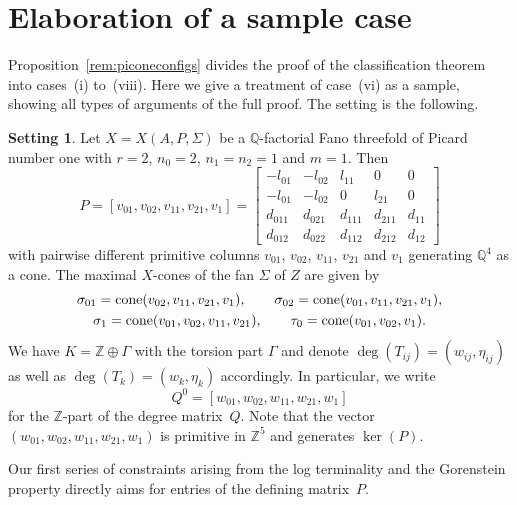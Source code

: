 \documentclass[10pt,a4paper]{amsart}
\theoremstyle{definition}
\newtheorem{setting}[thm]{Setting}
\def\ZZ{{\mathbb Z}}
\def\QQ{{\mathbb Q}}
\def\cone{{\rm cone}}
\numberwithin{equation}{section}
\begin{document}
\section{Elaboration of a sample case}
\label{sec:sample}

Proposition~\ref{rem:piconeconfigs} divides
the proof of the classification theorem
into cases~(i) to~(viii).
Here we give a treatment of case~(vi)
as a sample, showing all types of
arguments of the full proof.
The setting is the following.


\begin{setting}
\label{setting:r=2-n0=2-n1=1-n2=1-m=1}
Let $X = X(A,P,\Sigma)$ be a $\QQ$-factorial
Fano threefold of Picard number one with
$r=2$, $n_0=2$, $n_1=n_2=1$ and $m=1$.
Then
\begin{equation*}
P =[v_{01},v_{02},v_{11},v_{21},v_1] =
\begin{bmatrix}
-l_{01} & -l_{02} & l_{11} & 0 & 0
\\
-l_{01} & -l_{02} & 0 & l_{21} & 0
\\
d_{011} & d_{021} & d_{111} & d_{211} & d_{11}
\\
d_{012} & d_{022} & d_{112} & d_{212} & d_{12}
\end{bmatrix}
\end{equation*}
with pairwise different primitive columns
$v_{01}$, $v_{02}$, $v_{11}$, $v_{21}$ and $v_1$
generating $\QQ^4$ as a cone.
The maximal $X$-cones of the fan $\Sigma$ of $Z$ are given by
\begin{gather*}
\sigma_{01} = \cone(v_{02},v_{11},v_{21},v_1),\qquad
\sigma_{02} = \cone(v_{01},v_{11},v_{21},v_1),
\\
\sigma_{1} = \cone(v_{01},v_{02},v_{11},v_{21}),\qquad
\tau_{0} = \cone(v_{01},v_{02},v_1).
\end{gather*}
We have $K = \ZZ \oplus \Gamma$ with the torsion part
$\Gamma$ and denote $\deg(T_{ij}) = (w_{ij},\eta_{ij})$ as well
as $\deg(T_{k}) = (w_{k},\eta_{k})$ accordingly.
In particular, we write
\begin{equation*}
Q^0
 =
[w_{01},w_{02},w_{11},w_{21},w_1]
\end{equation*}
for the $\ZZ$-part of the degree matrix~$Q$. Note that the
vector~$(w_{01},w_{02},w_{11},w_{21},w_1)$ is primitive
in $\ZZ^5$ and generates $\ker(P)$.
\end{setting}


Our first series of constraints arising
from the log terminality and the Gorenstein
property directly aims for entries of
the defining matrix~$P$.
\end{document}
